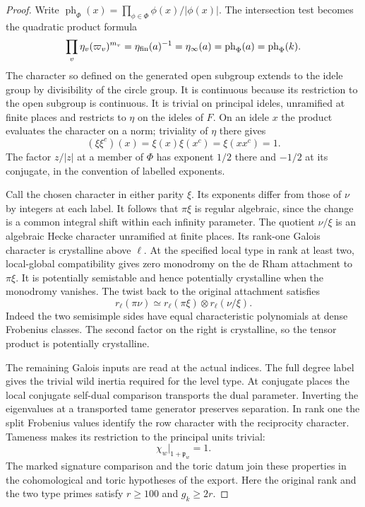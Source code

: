 \begin{proof}
Write
\(\operatorname{ph}_\Phi(x)=\prod_{\phi\in\Phi}\phi(x)/|\phi(x)|\).
The intersection test becomes the quadratic product formula
\[
 \prod_v\eta_v(\varpi_v)^{m_v}
 =\eta_{\rm fin}(a)^{-1}=\eta_\infty(a)
 =\operatorname{ph}_\Phi(a)=\operatorname{ph}_\Phi(k).
\]
The character so defined on the generated open subgroup extends
to the idele group by divisibility of the circle group. It is
continuous because its restriction to the open subgroup is
continuous. It is trivial on principal ideles, unramified at
finite places and restricts to \(\eta\) on the ideles of \(F\).
On an idele \(x\) the product evaluates the character on a norm; triviality of \(\eta\) there gives
\[
 (\xi\xi^c)(x)=\xi(x)\xi(x^c)=\xi(xx^c)=1 .
\]
The factor \(z/|z|\) at a member of \(\Phi\) has exponent
\(1/2\) there and \(-1/2\) at its conjugate, in the convention
of labelled exponents.
\label{cor:automorphic-realization-51}

Call the chosen character in either parity \(\xi\).
Its exponents differ from those of \(\nu\) by integers at each
label. It follows that \(\pi\xi\) is regular algebraic, since
the change is a common integral shift within each infinity
parameter. The quotient \(\nu/\xi\) is an algebraic Hecke
character unramified at finite places. Its rank-one Galois
character is crystalline above \(\ell\).
At the specified local type in rank at least two, local-global
compatibility gives zero monodromy on the de Rham attachment
to \(\pi\xi\). It is potentially semistable and hence potentially
crystalline when the monodromy vanishes. The twist back to the
original attachment satisfies
\[
 r_\ell(\pi\nu)\simeq r_\ell(\pi\xi)\otimes r_\ell(\nu/\xi).
\]
Indeed the two semisimple sides have equal characteristic
polynomials at dense Frobenius classes. The second factor on the
right is crystalline, so the tensor product is potentially crystalline.
\cite{blggt-attachment,caraiani-monodromy,berger-differential}\label{cor:automorphic-realization-52}

The remaining Galois inputs are read at the actual indices.
The full degree label gives the trivial wild inertia
required for the level type. At conjugate places the local
conjugate self-dual comparison transports the dual parameter.
Inverting the eigenvalues at a transported tame generator
preserves separation. In rank one the split Frobenius values identify the row character with the reciprocity character. Tameness makes its restriction to the principal units trivial:
\[
 \chi_w|_{1+\mathfrak p_w}=1 .
\] The marked signature comparison and the
toric datum join these properties in the cohomological and
toric hypotheses of the export. Here the original rank and
the two type primes satisfy \(r\ge100\) and \(g_k\ge2r\).


\end{proof}
